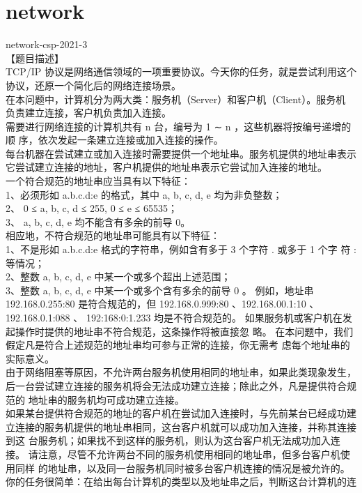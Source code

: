 \documentclass[12pt,twiside,a4paper]{ctexbook}
\numberwithin{chapter}{part}
\begin{document}
\section{network}
network-csp-2021-3\\
【题目描述】\\
TCP/IP 协议是网络通信领域的一项重要协议。今天你的任务，就是尝试利用这个
协议，还原一个简化后的网络连接场景。\\
在本问题中，计算机分为两大类：服务机（Server）和客户机（Client）。服务机
负责建立连接，客户机负责加入连接。\\
需要进行网络连接的计算机共有 n 台，编号为 1 ∼ n ，这些机器将按编号递增的顺
序，依次发起一条建立连接或加入连接的操作。\\
每台机器在尝试建立或加入连接时需要提供一个地址串。服务机提供的地址串表示
它尝试建立连接的地址，客户机提供的地址串表示它尝试加入连接的地址。\\
一个符合规范的地址串应当具有以下特征：\\
1、必须形如 a.b.c.d:e 的格式，其中 a, b, c, d, e 均为非负整数；\\
2、 0 ≤ a, b, c, d ≤ 255, 0 ≤ e ≤ 65535；\\
3、 a, b, c, d, e 均不能含有多余的前导 0。\\
相应地，不符合规范的地址串可能具有以下特征：\\
1、不是形如 a.b.c.d:e 格式的字符串，例如含有多于 3 个字符 . 或多于 1 个字
符 : 等情况；\\
2、整数 a, b, c, d, e 中某一个或多个超出上述范围；\\
3、整数 a, b, c, d, e 中某一个或多个含有多余的前导 0 。
例如，地址串 192.168.0.255:80 是符合规范的，但 192.168.0.999:80 、192.168.00.1:10
、 192.168.0.1:088 、 192:168:0:1.233 均是不符合规范的。
如果服务机或客户机在发起操作时提供的地址串不符合规范，这条操作将被直接忽
略。
在本问题中，我们假定凡是符合上述规范的地址串均可参与正常的连接，你无需考
虑每个地址串的实际意义。\\
由于网络阻塞等原因，不允许两台服务机使用相同的地址串，如果此类现象发生，
后一台尝试建立连接的服务机将会无法成功建立连接；除此之外，凡是提供符合规范的
地址串的服务机均可成功建立连接。\\
如果某台提供符合规范的地址的客户机在尝试加入连接时，与先前某台已经成功建
立连接的服务机提供的地址串相同，这台客户机就可以成功加入连接，并称其连接到这
台服务机；如果找不到这样的服务机，则认为这台客户机无法成功加入连接。
请注意，尽管不允许两台不同的服务机使用相同的地址串，但多台客户机使用同样
的地址串，以及同一台服务机同时被多台客户机连接的情况是被允许的。
你的任务很简单：在给出每台计算机的类型以及地址串之后，判断这台计算机的连
\end{document}
